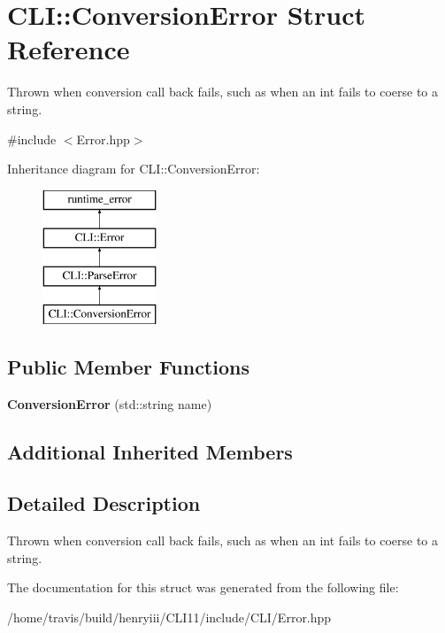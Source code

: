 \hypertarget{struct_c_l_i_1_1_conversion_error}{}\section{C\+LI\+:\+:Conversion\+Error Struct Reference}
\label{struct_c_l_i_1_1_conversion_error}


Thrown when conversion call back fails, such as when an int fails to coerse to a string.  




{\ttfamily \#include $<$Error.\+hpp$>$}

Inheritance diagram for C\+LI\+:\+:Conversion\+Error\+:\begin{figure}[H]
\begin{center}
\leavevmode
\includegraphics[height=4.000000cm]{struct_c_l_i_1_1_conversion_error}
\end{center}
\end{figure}
\subsection*{Public Member Functions}
\begin{DoxyCompactItemize}
\item 
\mbox{\label{struct_c_l_i_1_1_conversion_error_a34cb19ea419b1730924966ca774788f0}} 
{\bfseries Conversion\+Error} (std\+::string name)
\end{DoxyCompactItemize}
\subsection*{Additional Inherited Members}


\subsection{Detailed Description}
Thrown when conversion call back fails, such as when an int fails to coerse to a string. 

The documentation for this struct was generated from the following file\+:\begin{DoxyCompactItemize}
\item 
/home/travis/build/henryiii/\+C\+L\+I11/include/\+C\+L\+I/Error.\+hpp\end{DoxyCompactItemize}
